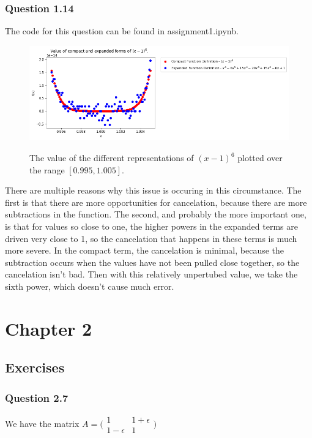 \documentclass{article}
\begin{document}
\subsubsection{Question 1.14}
The code for this question can be found in assignment1.ipynb.
\begin{figure}[H]
	\includegraphics[width=\textwidth]{polinomial_error.png} 
	\label{fig:q10CP}
	\caption{The value of the different representations of $(x-1)^6$
	plotted over the range $[0.995, 1.005]$.}
\end{figure}

There are multiple reasons why this issue is occuring in this circumstance.
The first is that there are more opportunities for cancelation, because there
are more subtractions in the function. The second, and probably the more important
one, is that for values so close to one, the higher powers in the expanded terms are
driven very close to 1, so the cancelation that happens in these terms is much more severe.
In the compact term, the cancelation is minimal, because the subtraction occurs
when the values have not been pulled close together, so the cancelation isn't bad.
Then with this relatively unpertubed value, we take the sixth power,
which doesn't cause much error.



\section{Chapter 2}
\subsection{Exercises}
\subsubsection{Question 2.7}
We have the matrix $A = 
\bigl( \begin{smallmatrix} 
  1 & 1 + \epsilon\\
  1 - \epsilon & 1 
\end{smallmatrix} \bigr)$
\end{document}
